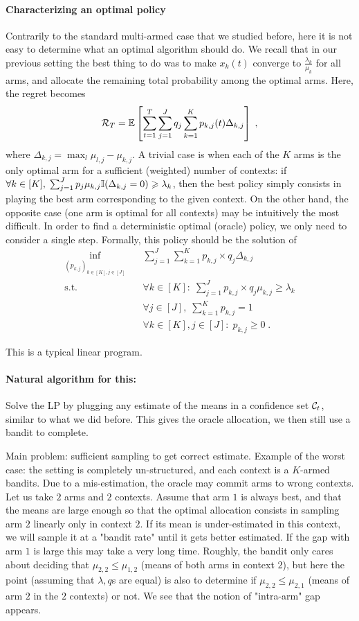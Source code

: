 \paragraph{Characterizing an optimal policy} Contrarily to the standard multi-armed case that we studied before, here it is not easy to determine what an optimal algorithm should do. We recall that in our previous setting the best thing to do was to make $x_k(t)$ converge to $\frac{\lambda_k}{\mu_k}$ for all arms, and allocate the remaining total probability among the optimal arms. Here, the regret becomes 
\[\mathcal{R}_T = \mathbb{E}\left[\sum_{t=1}^T \sum_{j=1}^J q_j \sum_{k=1}^K p_{k,j}(t)\Delta_{k,j}\right]\;, \]
where $\Delta_{k, j}=\max_{l} \mu_{l, j} - \mu_{k,j}$. A trivial case is when each of the $K$ arms is the only optimal arm for a sufficient (weighted) number of contexts: if $\forall k \in [K], \;\sum_{j=1}^J p_j \mu_{k,j} \mathbb{I}(\Delta_{k,j}=0)\geqslant \lambda_k$, then the best policy simply consists in playing the best arm corresponding to the given context. On the other hand, the opposite case (one arm is optimal for all contexts) may be intuitively the most difficult. In order to find a deterministic optimal (oracle) policy, we only need to consider a single step. Formally, this policy should be the solution of 
\begin{align*}
\inf_{(p_{k,j})_{k \in [K], j \in [J]}} \quad & \sum_{j=1}^J  \sum_{k=1}^K p_{k,j}\times  q_j\Delta_{k, j}\\
\textrm{s.t.} \quad & \forall k \in [K]: \; \sum_{j=1}^J p_{k,j} \times q_j \mu_{k, j} \geq \lambda_k\\
& \forall j \in [J], \; \sum_{k=1}^K p_{k,j} =1 \\
& \forall k \in [K], j \in [J]: \; p_{k,j} \geq 0 \;.
\end{align*}

This is a typical linear program.

\paragraph{Natural algorithm for this:} Solve the LP by plugging any estimate of the means in a confidence set $\mathcal{C}_t$, similar to what we did before. This gives the oracle allocation, we then still use a bandit to complete. 

Main problem: sufficient sampling to get correct estimate. Example of the worst case: the setting is completely un-structured, and each context is a $K$-armed bandits. Due to a mis-estimation, the oracle may commit arms to wrong contexts. Let us take $2$ arms and $2$ contexts. Assume that arm $1$ is always best, and that the means are large enough so that the optimal allocation consists in sampling arm $2$ linearly only in context $2$. If its mean is under-estimated in this context, we will sample it at a "bandit rate" until it gets better estimated. If the gap with arm $1$ is large this may take a very long time. Roughly, the bandit only cares about deciding that $\mu_{2,2}\leq \mu_{1, 2} $ (means of both arms in context $2$), but here the point (assuming that $\lambda,q$s are equal) is also to determine if $\mu_{2,2}\leq \mu_{2,1}$ (means of arm $2$ in the $2$ contexts) or not. We see that the notion of "intra-arm" gap appears.

